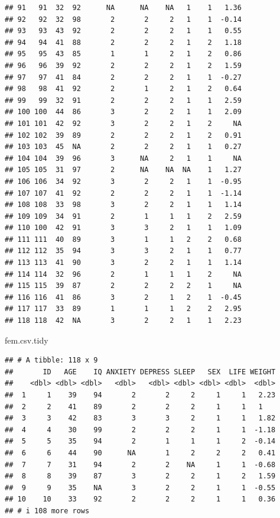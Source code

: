 \documentclass[
]{book}
\newenvironment{Shaded}{\begin{snugshade}}{\end{snugshade}}
\newcommand{\NormalTok}[1]{#1}
\begin{document}
\begin{verbatim}
## 91   91  32  92      NA      NA    NA   1    1   1.36
## 92   92  32  98       2       2     2   1    1  -0.14
## 93   93  43  92       2       2     2   1    1   0.55
## 94   94  41  88       2       2     2   1    2   1.18
## 95   95  43  85       1       1     2   1    2   0.86
## 96   96  39  92       2       2     2   1    2   1.59
## 97   97  41  84       2       2     2   1    1  -0.27
## 98   98  41  92       2       1     2   1    2   0.64
## 99   99  32  91       2       2     2   1    1   2.59
## 100 100  44  86       3       2     2   1    1   2.09
## 101 101  42  92       3       2     2   1    2     NA
## 102 102  39  89       2       2     2   1    2   0.91
## 103 103  45  NA       2       2     2   1    1   0.27
## 104 104  39  96       3      NA     2   1    1     NA
## 105 105  31  97       2      NA    NA  NA    1   1.27
## 106 106  34  92       3       2     2   1    1  -0.95
## 107 107  41  92       2       2     2   1    1  -1.14
## 108 108  33  98       3       2     2   1    1   1.14
## 109 109  34  91       2       1     1   1    2   2.59
## 110 100  42  91       3       3     2   1    1   1.09
## 111 111  40  89       3       1     1   2    2   0.68
## 112 112  35  94       3       3     2   1    1   0.77
## 113 113  41  90       3       2     2   1    1   1.14
## 114 114  32  96       2       1     1   1    2     NA
## 115 115  39  87       2       2     2   2    1     NA
## 116 116  41  86       3       2     1   2    1  -0.45
## 117 117  33  89       1       1     1   2    2   2.95
## 118 118  42  NA       3       2     2   1    1   2.23
\end{verbatim}

\begin{Shaded}
\begin{Highlighting}[]
\NormalTok{fem.csv.tidy}
\end{Highlighting}
\end{Shaded}

\begin{verbatim}
## # A tibble: 118 x 9
##       ID   AGE    IQ ANXIETY DEPRESS SLEEP   SEX  LIFE WEIGHT
##    <dbl> <dbl> <dbl>   <dbl>   <dbl> <dbl> <dbl> <dbl>  <dbl>
##  1     1    39    94       2       2     2     1     1   2.23
##  2     2    41    89       2       2     2     1     1   1   
##  3     3    42    83       3       3     2     1     1   1.82
##  4     4    30    99       2       2     2     1     1  -1.18
##  5     5    35    94       2       1     1     1     2  -0.14
##  6     6    44    90      NA       1     2     2     2   0.41
##  7     7    31    94       2       2    NA     1     1  -0.68
##  8     8    39    87       3       2     2     1     2   1.59
##  9     9    35    NA       3       2     2     1     1  -0.55
## 10    10    33    92       2       2     2     1     1   0.36
## # i 108 more rows
\end{verbatim}
\end{document}
